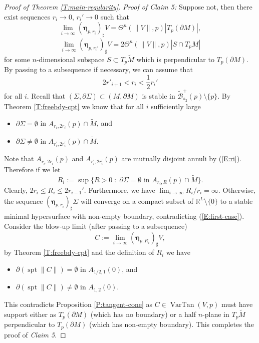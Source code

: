 \documentclass[10pt]{amsart}
\theoremstyle{definition}
\theoremstyle{remark}
\numberwithin{equation}{section}
\newcommand{\Si}{\Sigma}
\newcommand{\pr}{\prime}
\newcommand{\bleta}{\boldsymbol \eta}
\newcommand{\tM}{\widetilde{M}}
\newcommand{\tBcal}{\widetilde{\mathcal{B}}}
\newcommand{\VarTan}{\operatorname{VarTan}}
\newcommand{\spt}{\operatorname{spt}}
\begin{document}
\begin{proof}[Proof of Theorem \ref{T:main-regularity}]
\textit{Proof of Claim 5:} Suppose not, then there exist sequences $r_i \to 0$, $r_i'\to 0$ such that
\begin{equation}
\label{E:first-case} \lim_{i \to \infty} (\bleta_{p,r_i})_\sharp V = \Theta^n(\|V\|, p) |T_p(\partial M)|, 
\end{equation}
\[ \lim_{i \to \infty} (\bleta_{p,r_i'})_\sharp V = 2\Theta^n(\|V\|,p) |S \cap T_pM| \]
for some $n$-dimensional subspace $S \subset T_p \tM$ which is perpendicular to $T_p(\partial M)$. By passing to a subsequence if necessary, we can assume that 
\begin{equation}
\label{E:ri}
  2 r'_{i+1} < r_i < \frac{1}{2}  r_i'
 \end{equation}
for all $i$. Recall that $(\Sigma,\partial \Sigma) \subset (M,\partial M)$ is stable in $\tBcal^+_{s_2}(p) \setminus \{p\}$. By Theorem \ref{T:freebdy-cpt} we know that for all $i$ sufficiently large
\begin{itemize}
\item $\partial \Si = \emptyset$ in $A_{r_i, 2r_i}(p)\cap \tM$, and
\item $\partial \Si \neq \emptyset$ in $A_{r^\pr_i, 2r^\pr_i}(p)\cap \tM$.
\end{itemize}
Note that $A_{r_i, 2r_i}(p)$ and $A_{r^\pr_i, 2r^\pr_i}(p)$ are mutually disjoint annuli by (\ref{E:ri}). Therefore if we let 
\[ R_i:=\sup\{R>0 \; : \; \partial \Si=\emptyset \text{ in }  A_{r_i, R}(p)\cap \tM\}.\]
Clearly, $2r_i \leq R_i \leq 2r_{i-1}'$. Furthermore, we have $\lim_{i\rightarrow \infty}R_i/r_i=\infty$. Otherwise, the sequence $(\bleta_{p,r_i})_\sharp \Sigma$ will converge on a compact subset of $\mathbb{R}^L \setminus\{0\}$ to a stable minimal hypersurface with non-empty boundary, contradicting (\ref{E:first-case}). Consider the blow-up limit (after passing to a subsequence)
\[ C:=\lim_{i \to \infty} (\bleta_{p,R_i})_\sharp V,\]
by Theorem \ref{T:freebdy-cpt} and the definition of $R_i$ we have
\begin{itemize}
\item $\partial (\spt \|C\|) =\emptyset$ in $A_{1/2,1}(0)$, and
\item $\partial (\spt \|C\|) \neq \emptyset$ in $A_{1,2}(0)$.
\end{itemize}
This contradicts Proposition \ref{P:tangent-cone} as $C \in \VarTan(V,p)$ must have support either as $T_p (\partial M)$ (which has no boundary) or a half $n$-plane in $T_p \tM$ perpendicular to $T_p(\partial M)$ (which has non-empty boundary). This completes the proof of \emph{Claim 5}.


\end{proof}
\end{document}
